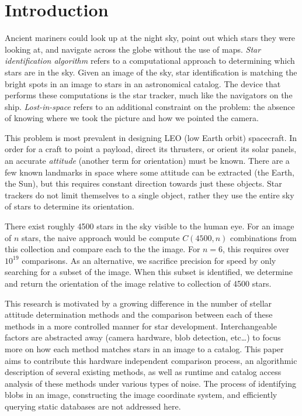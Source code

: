 \section{Introduction}\label{sec:introduction}
Ancient mariners could look up at the night sky, point out which stars they were looking at, and navigate across the
globe without the use of maps.
\textit{Star identification algorithm} refers to a computational approach to determining which stars are in the sky.
Given an image of the sky, star identification is matching the bright spots in an image to stars in an astronomical
catalog.
The device that performs these computations is the star tracker, much like the navigators on the ship.
\textit{Lost-in-space} refers to an additional constraint on the problem: the absence of knowing where we took
the picture and how we pointed the camera.

This problem is most prevalent in designing LEO (low Earth orbit) spacecraft.
In order for a craft to point a payload, direct its thrusters, or orient its solar panels, an accurate
\textit{attitude} (another term for orientation) must be known.
There are a few known landmarks in space where some attitude can be extracted (the Earth, the Sun), but this
requires constant direction towards just these objects.
Star trackers do not limit themselves to a single object, rather they use the entire sky of stars to determine its
orientation.

There exist roughly 4500 stars in the sky visible to the human eye.
For an image of $n$ stars, the naive approach would be compute $C(4500, n)$ combinations from this collection and
compare each to the the image.
For $n = 6$, this requires over $10^{19}$ comparisons.
As an alternative, we sacrifice precision for speed by only searching for a subset of the image.
When this subset is identified, we determine and return the orientation of the image relative to collection of 4500
stars.

This research is motivated by a growing difference in the number of stellar attitude determination methods and the
comparison between each of these methods in a more controlled manner for star development.
Interchangeable factors are abstracted away (camera hardware, blob detection, etc\ldots) to focus more on how each
method matches stars in an image to a catalog.
This paper aims to contribute this hardware independent comparison process, an algorithmic description of several
existing methods, as well as runtime and catalog access analysis of these methods under various types of noise.
The process of identifying blobs in an image, constructing the image coordinate system, and efficiently querying
static databases are not addressed here.
